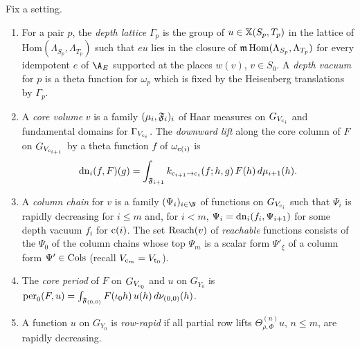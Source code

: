\begin{definition}\label{pf:fs:chain}
Fix a setting.
\begin{enumerate}[label=(\alph*)]
\item For a pair $p$, the \emph{depth lattice} $\Gamma_p$ is the group of $u\in\mathbb X(S_p,T_p)$ in the lattice of
$\mathrm{Hom}(\Lambda_{S_p},\Lambda_{T_p})$ such that $eu$ lies in the closure of $\mathfrak m\,\mathrm{Hom}(\Lambda_{S_p},\Lambda_{T_p})$
for every idempotent $e$ of $\A_E$ supported at the places $w(v)$, $v\in S_0$. A \emph{depth vacuum} for $p$ is a theta function
for $\omega_p$ which is fixed by the Heisenberg translations by $\Gamma_p$.
\item A \emph{core volume} $v$ is a family $(\mu_i,\mathfrak F_i)_{i}$ of Haar measures on $G_{V_{\mathrm{c}_i}}$ and fundamental domains for
$\Gamma_{V_{\mathrm{c}_i}}$. The \emph{downward lift} along the core column of $F$ on $G_{V_{\mathrm{c}_{i+1}}}$ by a theta function $f$ of
$\omega_{\mathrm{c}(i)}$ is
\[
\mathrm{dn}_i(f,F)(g)=\int_{\mathfrak F_{i+1}}k_{\mathrm{c}_{i+1}\to\mathrm{c}_i}(f;h,g)\,F(h)\,d\mu_{i+1}(h).
\]
\item A \emph{column chain} for $v$ is a family $(\Psi_i)_{i\in\N}$ of functions on $G_{V_{\mathrm{c}_i}}$ such that $\Psi_i$ is rapidly
decreasing for $i\le m$ and, for $i<m$, $\Psi_i=\mathrm{dn}_i(f_i,\Psi_{i+1})$ for some depth vacuum $f_i$ for $\mathrm{c}(i)$. The set
$\mathrm{Reach}(v)$ of \emph{reachable} functions consists of the $\Psi_0$ of the column chains whose top $\Psi_m$ is a scalar form
$\Psi'_\xi$ of a column form $\Psi'\in\mathrm{Cols}$ (recall $V_{\mathrm{c}_m}=V_{\mathrm{t}_0}$).
\item The \emph{core period} of $F$ on $G_{V_{\mathrm{c}_0}}$ and $u$ on $G_{Y_0}$ is
$\mathrm{per}_0(F,u)=\int_{\mathfrak F_{(0,0)}}F(\iota_0h)\,u(h)\,d\nu_{(0,0)}(h)$.
\item A function $u$ on $G_{Y_0}$ is \emph{row-rapid} if all partial row lifts $\Theta^{(n)}_{\rho,\Phi}u$, $n\le m$, are
rapidly decreasing.
\end{enumerate}
\end{definition}

